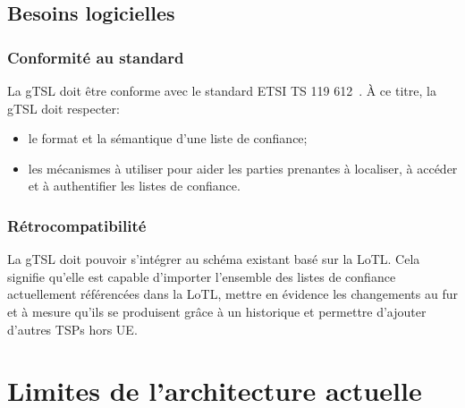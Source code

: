 \documentclass{tnreport}
\begin{document}
\subsection{Besoins logicielles}

\subsubsection{Conformité au standard}

La gTSL doit être conforme avec le standard ETSI TS 119 612~\cite{ETSITS119612}. À ce titre, la gTSL doit respecter:
\begin{itemize}
	\item le format et la sémantique d'une liste de confiance;
	\item les mécanismes à utiliser pour aider les parties prenantes à localiser, à accéder et à authentifier les listes de confiance.
\end{itemize}

\subsubsection{Rétrocompatibilité}

La gTSL doit pouvoir s'intégrer au schéma existant basé sur la LoTL. Cela signifie qu'elle est capable d'importer l'ensemble des listes de confiance actuellement référencées dans la LoTL, mettre en évidence les changements au fur et à mesure qu'ils se produisent grâce à un historique et permettre d'ajouter d'autres TSPs hors UE.

\section{Limites de l'architecture actuelle}
\label{sec:limits}
\end{document}

